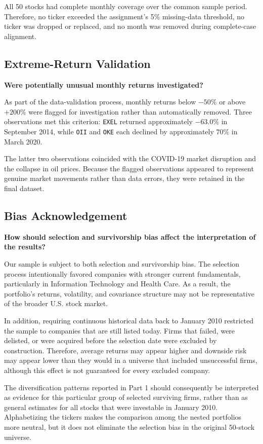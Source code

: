 \documentclass[11pt]{article}
\begin{document}
All 50 stocks had complete monthly coverage over the common sample period.
Therefore, no ticker exceeded the assignment's 5\% missing-data threshold, no
ticker was dropped or replaced, and no month was removed during complete-case
alignment.

\subsection{Extreme-Return Validation}

\textbf{Were potentially unusual monthly returns investigated?}

As part of the data-validation process, monthly returns below $-50\%$ or above
$+200\%$ were flagged for investigation rather than automatically removed.
Three observations met this criterion: \texttt{EXEL} returned approximately
$-63.0\%$ in September 2014, while \texttt{OII} and \texttt{OKE} each declined
by approximately $70\%$ in March 2020.

The latter two observations coincided with the COVID-19 market disruption and
the collapse in oil prices. Because the flagged observations appeared to
represent genuine market movements rather than data errors, they were retained
in the final dataset.

\subsection{Bias Acknowledgement}

\textbf{How should selection and survivorship bias affect the interpretation
of the results?}

Our sample is subject to both selection and survivorship bias. The selection
process intentionally favored companies with stronger current fundamentals,
particularly in Information Technology and Health Care. As a result, the
portfolio's returns, volatility, and covariance structure may not be
representative of the broader U.S. stock market.

In addition, requiring continuous historical data back to January 2010
restricted the sample to companies that are still listed today. Firms that
failed, were delisted, or were acquired before the selection date were excluded
by construction. Therefore, average returns may appear higher and downside risk
may appear lower than they would in a universe that included unsuccessful
firms, although this effect is not guaranteed for every excluded company.

The diversification patterns reported in Part 1 should consequently be
interpreted as evidence for this particular group of selected surviving firms,
rather than as general estimates for all stocks that were investable in January
2010. Alphabetizing the tickers makes the comparison among the nested
portfolios more neutral, but it does not eliminate the selection bias in the
original 50-stock universe.
\end{document}
